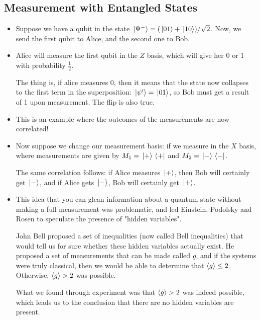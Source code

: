 \subsection{Measurement with Entangled States}
\begin{itemize}
	\item Suppose we have a qubit in the state \( \ket*{\Psi^{-}} = (\ket*{01} + \ket*{10}) / \sqrt{2} \). Now, 
		we send the first qubit to Alice, and the second one to Bob. 
	\item Alice will measure the first qubit in the \( Z \) basis, which will give her 0 or 1 with probability 
		\( \frac{1}{2} \). 

		The thing is, if alice measures 0, then it means that the state now collapses to the first term 
		in the superposition: \( \ket*{\psi'} = \ket*{01} \), so Bob must get a result of 1 upon measurement. The
		flip is also true.
	\item This is an example where the outcomes of the measurements are now correlated! 
	\item Now suppose we change our measurement basis: if we measure in the \( X \) basis, where measurements 
		are given by \( M_1 = \ket*{+}\bra*{+} \) and \( M_2 = \ket*{-}\bra*{-} \).

		The same correlation follows: if Alice measures \( \ket*{+} \), then Bob will certainly get \( \ket*{-} \), and
		if  Alice gets \( \ket*{-} \), Bob will certainly get \( \ket*{+} \).

	\item This idea that you can glean information about a quantum state without making a full measurement was 
		problematic, and led Einstein, Podolsky and Rosen to speculate the presence of "hidden variables". 

		John Bell proposed a set of inequalities (now called Bell inequalities) that would tell us for sure whether 
		these hidden variables actually exist. He proposed a set of measurements that can be made called \( g \), 
		and if the systems were truly classical, then we would be able to determine that \( \langle g \rangle \le 2 \). 
		Otherwise, \( \langle g \rangle > 2 \) was possible. 

		What we found through experiment was that \( \langle g \rangle > 2 \) was indeed possible, which leads us to the 
		conclusion that there are no hidden variables are present.  
\end{itemize}
